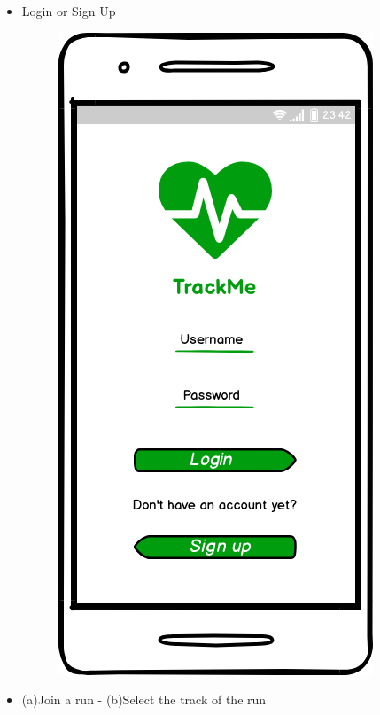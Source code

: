 \documentclass{article}
\begin{document}
\begin{legal}
\begin{legal}
\begin{legal}
{					\begin{itemize}
    					\item Login or Sign Up 
						\begin{figure}[H]
						\centering
  						\includegraphics[scale=0.275]{./images/mockups/Login-Sign-up.png}
						\end{figure}
					\item  (a)Join a run - (b)Select the track of the run
						\begin{figure}[H]
						\centering
						\begin{subfigure}{.5\textwidth}
  						\centering

\end{subfigure}
\end{figure}
\end{itemize}}
\end{legal}
\end{legal}
\end{legal}
\end{document}
